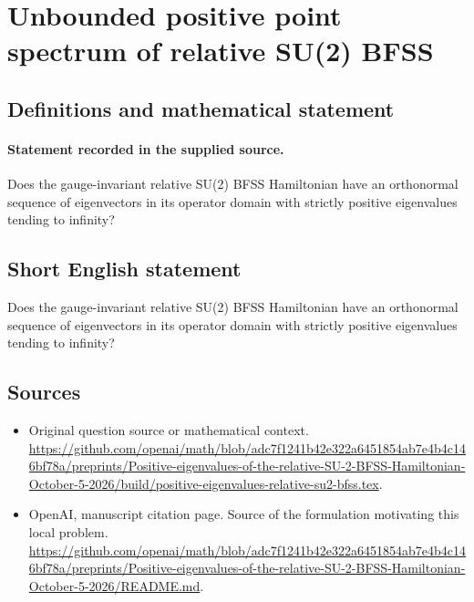 \documentclass[11pt]{article}
\begin{document}
\section*{Unbounded positive point spectrum of relative SU(2) BFSS}\label{statement}
\subsection{Definitions and mathematical statement}
\paragraph{Statement recorded in the supplied source.}
Does the gauge-invariant relative SU(2) BFSS Hamiltonian have an orthonormal sequence of eigenvectors in its operator domain with strictly positive eigenvalues tending to infinity?
\subsection{Short English statement}
Does the gauge-invariant relative SU(2) BFSS Hamiltonian have an orthonormal sequence of eigenvectors in its operator domain with strictly positive eigenvalues tending to infinity?
\subsection{Sources}
\begin{itemize}
\item[S1] Original question source or mathematical context.
\url{https://github.com/openai/math/blob/adc7f1241b42e322a6451854ab7e4b4c146bf78a/preprints/Positive-eigenvalues-of-the-relative-SU-2-BFSS-Hamiltonian-October-5-2026/build/positive-eigenvalues-relative-su2-bfss.tex}.
\item[S2] OpenAI, manuscript citation page. Source of the formulation motivating this local problem.
\url{https://github.com/openai/math/blob/adc7f1241b42e322a6451854ab7e4b4c146bf78a/preprints/Positive-eigenvalues-of-the-relative-SU-2-BFSS-Hamiltonian-October-5-2026/README.md}.
\end{itemize}
\end{document}
